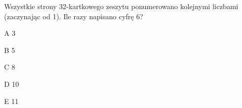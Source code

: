 \begin{tresc}
Wszystkie strony 32-kartkowego zeszytu ponumerowano kolejnymi liczbami (zaczynając od 1). Ile razy napisano cyfrę 6?
\end{tresc}
\begin{wariant}{A} 3 \end{wariant}
\begin{wariant}{B} 5 \end{wariant}
\begin{wariant}{C} 8 \end{wariant}
\begin{wariant}{D} 10 \end{wariant}
\begin{wariant}{E} 11 \end{wariant}
